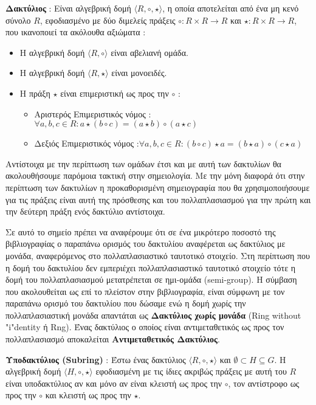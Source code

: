 \begin{definition}
\textbf{Δακτύλιος} : Είναι αλγεβρική δομή $\langle R, \circ, \star \rangle$, η οποία αποτελείται από ένα μη κενό σύνολο $R$, εφοδιασμένο με δύο διμελείς πράξεις $\circ:R \times R \rightarrow R$ και $\star: R \times R \rightarrow R$, που ικανοποιεί τα ακόλουθα αξιώματα :

\begin{itemize}
    \item Η αλγεβρική δομή $\langle R, \circ \rangle$ είναι αβελιανή ομάδα.
    \item Η αλγεβρική δομή $\langle R, \star \rangle$ είναι μονοειδές.
    \item Η πράξη $\star$ είναι επιμεριστική ως προς την $\circ$ :
    \begin{itemize}
        \item Αριστερός Επιμεριστικός νόμος : $\forall a, b, c \in R : a \star (b \circ c) = (a \star b) \circ (a \star c)$
        \item Δεξιός Επιμεριστικός νόμος :$\forall a, b, c \in R : (b \circ c) \star a = (b \star a) \circ (c \star a)$
    \end{itemize}
    \end{itemize}
\end{definition}

Αντίστοιχα με την περίπτωση των ομάδων έτσι και με αυτή των δακτυλίων θα ακολουθήσουμε παρόμοια τακτική στην σημειολογία. Με την μόνη διαφορά ότι στην περίπτωση των δακτυλίων η προκαθορισμένη σημειογραφία που θα χρησιμοποιήσουμε για τις πράξεις είναι αυτή της πρόσθεσης και του πολλαπλασιασμού για την πρώτη και την δεύτερη πράξη ενός δακτύλιο αντίστοιχα.

Σε αυτό το σημείο πρέπει να αναφέρουμε ότι σε ένα μικρότερο ποσοστό της βιβλιογραφίας ο παραπάνω ορισμός του δακτυλίου αναφέρεται ως δακτύλιος με μονάδα, αναφερόμενος στο πολλαπλασιαστικό ταυτοτικό στοιχείο. Στη περίπτωση που η δομή του δακτυλίου δεν εμπεριέχει πολλαπλασιαστικό ταυτοτικό στοιχείο τότε η δομή του πολλαπλασιασμού μετατρέπεται σε ημι-ομάδα (semi-group). Η σύμβαση που ακολουθείται ως επί το πλείστον στην βιβλιογραφία, είναι σύμφωνη με τον παραπάνω ορισμό του δακτυλίου που δώσαμε ενώ η δομή χωρίς την πολλαπλασιαστική μονάδα απαντάται ως \textbf{Δακτύλιος χωρίς μονάδα} (Ring without "i"dentity ή Rng). Ένας δακτύλιος ο οποίος είναι αντιμεταθετικός ως προς τον πολλαπλασιασμό αποκαλείται \textbf{Αντιμεταθετικός Δακτύλιος}.

\begin{definition}
\textbf{Υποδακτύλιος (Subring)} : Έστω ένας δακτύλιος $\langle R, \circ, \star \rangle$ και $\emptyset \subset Η \subseteq G$. Η αλγεβρική δομή $\langle H, \circ, \star \rangle$ εφοδιασμένη με τις ίδιες ακριβώς πράξεις με αυτή του $R$ είναι υποδακτύλιος αν και μόνο αν είναι κλειστή ως προς την $\circ$, τον αντίστροφο ως προς την $\circ$ και κλειστή ως προς την $\star$.
\end{definition}


